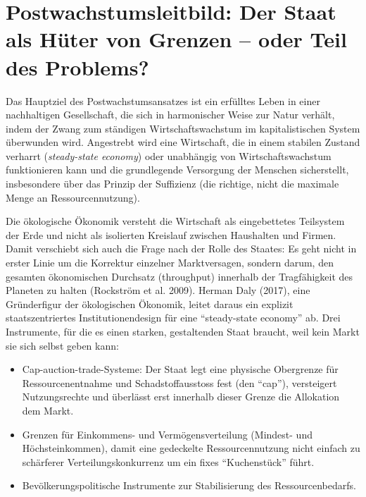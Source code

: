 \documentclass[
  nswissgerman,
  a4paper,
  DIV=11,
  numbers=noendperiod,
  oneside,
  openany]{scrreprt}
\begin{document}
\section{Postwachstumsleitbild: Der Staat als Hüter von Grenzen -- oder
Teil des
Problems?}\label{postwachstumsleitbild-der-staat-als-huxfcter-von-grenzen-oder-teil-des-problems}

Das Hauptziel des Postwachstumsansatzes ist ein erfülltes Leben in einer
nachhaltigen Gesellschaft, die sich in harmonischer Weise zur Natur
verhält, indem der Zwang zum ständigen Wirtschaftswachstum im
kapitalistischen System überwunden wird. Angestrebt wird eine
Wirtschaft, die in einem stabilen Zustand verharrt (\emph{steady-state
economy}) oder unabhängig von Wirtschaftswachstum funktionieren kann und
die grundlegende Versorgung der Menschen sicherstellt, insbesondere über
das Prinzip der Suffizienz (die richtige, nicht die maximale Menge an
Ressourcennutzung).

Die ökologische Ökonomik versteht die Wirtschaft als eingebettetes
Teilsystem der Erde und nicht als isolierten Kreislauf zwischen
Haushalten und Firmen. Damit verschiebt sich auch die Frage nach der
Rolle des Staates: Es geht nicht in erster Linie um die Korrektur
einzelner Marktversagen, sondern darum, den gesamten ökonomischen
Durchsatz (throughput) innerhalb der Tragfähigkeit des Planeten zu
halten (Rockström et al. 2009). Herman Daly (2017), eine Gründerfigur
der ökologischen Ökonomik, leitet daraus ein explizit staatszentriertes
Institutionendesign für eine ``steady-state economy'' ab. Drei
Instrumente, für die es einen starken, gestaltenden Staat braucht, weil
kein Markt sie sich selbst geben kann:

\begin{itemize}
\item
  Cap-auction-trade-Systeme: Der Staat legt eine physische Obergrenze
  für Ressourcenentnahme und Schadstoffausstoss fest (den ``cap''),
  versteigert Nutzungsrechte und überlässt erst innerhalb dieser Grenze
  die Allokation dem Markt.
\item
  Grenzen für Einkommens- und Vermögensverteilung (Mindest- und
  Höchsteinkommen), damit eine gedeckelte Ressourcennutzung nicht
  einfach zu schärferer Verteilungskonkurrenz um ein fixes
  ``Kuchenstück'' führt.
\item
  Bevölkerungspolitische Instrumente zur Stabilisierung des
  Ressourcenbedarfs.
\end{itemize}
\end{document}
